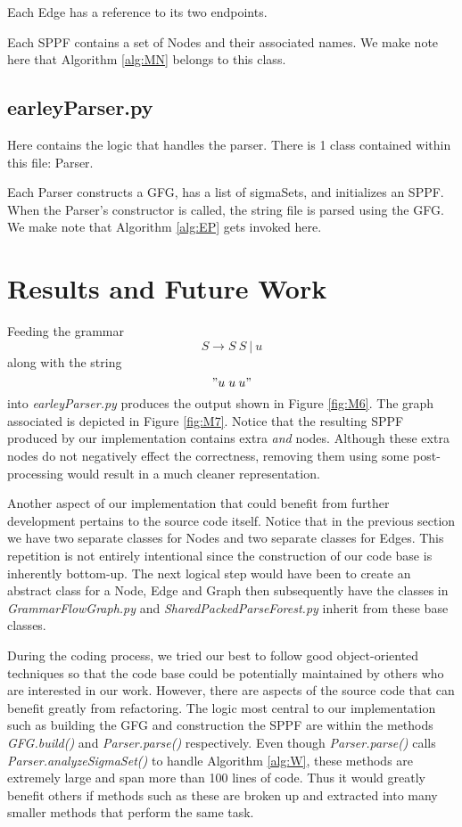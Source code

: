 \documentclass{sigplanconf}
\begin{document}
Each Edge has a reference to its two endpoints. 

Each SPPF contains a set of Nodes and their associated names. We make note here that Algorithm \ref{alg:MN} belongs to this class.

\subsection{earleyParser.py}

Here contains the logic that handles the parser. There is 1 class contained within this file: Parser.

Each Parser constructs a GFG, has a list of sigmaSets, and initializes an SPPF. When the Parser's constructor is called, the string file is parsed using the GFG. We make note that Algorithm \ref{alg:EP} gets invoked here.

\section{Results and Future Work}

Feeding the grammar $$S\longrightarrow{S\:{S\:{|\:{u}}}}$$ along with the string $$"u\;{u\:{u}}"$$ into \textit{earleyParser.py} produces the output shown in Figure \ref{fig:M6}. The graph associated is depicted in Figure \ref{fig:M7}. Notice that the resulting SPPF produced by our implementation contains extra \textit{and} nodes. Although these extra nodes do not negatively effect the correctness, removing them using some post-processing would result in a much cleaner representation.

Another aspect of our implementation that could benefit from further development pertains to the source code itself. Notice that in the previous section we have two separate classes for Nodes and two separate classes for Edges. This repetition is not entirely intentional since the construction of our code base is inherently bottom-up. The next logical step would have been to create an abstract class for a Node, Edge and Graph then subsequently have the classes in \textit{GrammarFlowGraph.py} and \textit{SharedPackedParseForest.py} inherit from these base classes.

During the coding process, we tried our best to follow good object-oriented techniques so that the code base could be potentially maintained by others who are interested in our work. However, there are aspects of the source code that can benefit greatly from refactoring. The logic most central to our implementation such as building the GFG and construction the SPPF are within the methods \textit{GFG.build()} and \textit{Parser.parse()} respectively. Even though \textit{Parser.parse()} calls \textit{Parser.analyzeSigmaSet()} to handle Algorithm \ref{alg:W}, these methods are extremely large and span more than 100 lines of code. Thus it would greatly benefit others if methods such as these are broken up and extracted into many smaller methods that perform the same task.
\end{document}
